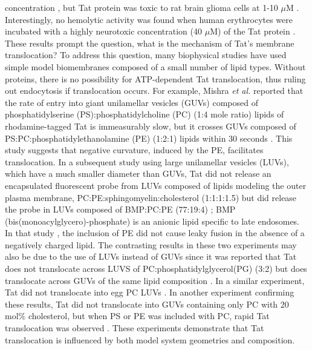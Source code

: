 concentration \cite{Vives97}, but Tat protein was toxic 
to rat brain glioma cells at 1-10 $\mu$M \cite{Sabatier91}. 
Interestingly, no hemolytic activity was found when human erythrocytes
were incubated with a highly neurotoxic concentration (40 $\mu$M) of the Tat protein 
\cite{Sabatier91}. 
These results prompt the question, what is the mechanism of 
Tat’s membrane translocation?
To address this question, many biophysical studies have used simple model
biomembranes composed of a small number of lipid types. 
Without proteins, there is no possibility for ATP-dependent Tat translocation, 
thus ruling out endocytosis if
translocation occurs. 
For example, Mishra \textit{et al.} reported that the rate of 
entry into giant
unilamellar vesicles (\acs{GUV}s) composed of phosphatidylserine (\acs{PS}):phosphatidylcholine (\acs{PC})
(1:4 mole ratio) lipids of rhodamine-tagged Tat
is immeasurably slow, but it crosses GUVs composed of 
PS:PC:phosphatidylethanolamine (\acs{PE}) (1:2:1) lipids 
within 30 seconds \cite{Mishra08}. 
This study suggests that negative curvature, induced by the PE, 
facilitates translocation. 
In a subsequent study using large unilamellar vesicles (\acs{LUV}s), which 
have a much smaller diameter than GUVs,
Tat did not release an encapsulated fluorescent probe from LUVs composed of 
lipids modeling the outer plasma membrane, PC:PE:sphingomyelin:cholesterol (1:1:1:1.5) 
but did release the probe in LUVs composed of BMP:PC:PE (77:19:4) \cite{Yang10}; 
BMP (bis(monoacylglycero)-phosphate) is an anionic lipid specific to late 
endosomes. 
In that study \cite{Yang10}, the inclusion of PE did not 
cause leaky fusion in the absence of a negatively charged lipid. 
The 
contrasting results in these two experiments may also be due to the use of LUVs 
instead of GUVs since it was reported that Tat does not translocate across LUVS 
of PC:phosphatidylglycerol(\acs{PG}) (3:2) but does translocate across GUVs of the same lipid composition 
\cite{Thoren04}. In a similar experiment, Tat did not translocate into egg PC
LUVs \cite{Kramer03}. 
In another experiment confirming these results, Tat did 
not translocate into GUVs containing only PC with 20 mol\% cholesterol, but 
when PS or PE was included with PC, rapid Tat translocation was observed 
\cite{Ciobanasu10}. 
These experiments demonstrate that Tat translocation is influenced by both
model system geometries and composition.

